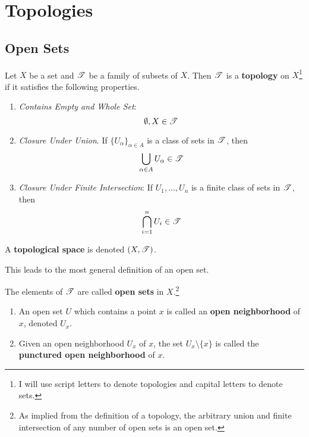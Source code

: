 \section{Topologies} 

  \subsection{Open Sets} 

    \begin{definition}[Topology]
      Let $X$ be a set and $\T$ be a family of subsets of $X$. Then $\T$ is a \textbf{topology} on $X$\footnote{I will use script letters to denote topologies and capital letters to denote sets.} if it satisfies the following properties. 
      \begin{enumerate}
        \item \textit{Contains Empty and Whole Set}: 
        \begin{equation}
          \emptyset, X \in \T
        \end{equation}

        \item \textit{Closure Under Union}. If $\{U_\alpha\}_{\alpha \in A}$ is a class of sets in $\T$, then 
        \begin{equation}
          \bigcup_{\alpha \in A} U_\alpha \in \T
        \end{equation}

        \item \textit{Closure Under Finite Intersection}: If $U_1, \ldots, U_n$ is a finite class of sets in $\T$, then 
        \begin{equation}
         \bigcap_{i=1}^{n} U_i \in \T
        \end{equation}
      \end{enumerate}
      A \textbf{topological space} is denoted $(X, \T)$. 
    \end{definition}

    This leads to the most general definition of an open set. 

    \begin{definition}
      The elements of $\T$ are called \textbf{open sets} in $X$.\footnote{As implied from the definition of a topology, the arbitrary union and finite intersection of any number of open sets is an open set.} 
      \begin{enumerate}
        \item An open set $U$ which contains a point $x$ is called an \textbf{open neighborhood} of $x$, denoted $U_x$. 
        \item Given an open neighborhood $U_x$ of $x$, the set $U_x \setminus \{x\}$ is called the \textbf{punctured open neighborhood} of $x$. 
      \end{enumerate}
    \end{definition}

